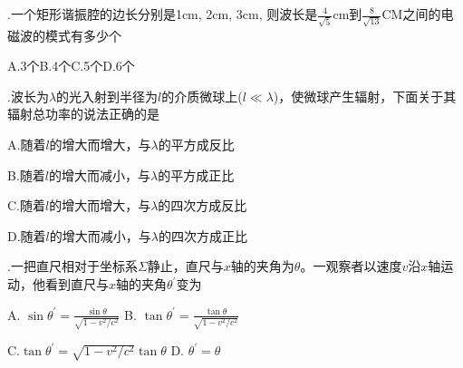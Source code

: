 .\hspace{0.8em}一个矩形谐振腔的边长分别是1cm, 2cm, 3cm, 则波长是$\displaystyle{ \frac{4}{\sqrt{5}} }$cm到$\displaystyle{ \frac{8}{\sqrt{13}} }$CM之间的电磁波的模式有多少个
\vspace{0.2cm}

A.\hspace{0.8em}3个\hspace{5em}B.\hspace{0.8em}4个\hspace{5em}C.\hspace{0.8em}5个\hspace{5em}D.\hspace{0.8em}6个
\vspace{0.3cm}

.\hspace{0.8em}波长为$\lambda$的光入射到半径为$l$的介质微球上($l \ll \lambda $)，使微球产生辐射，下面关于其辐射总功率的说法正确的是
\vspace{0.4cm}

A.\hspace{0.8em}随着$l$的增大而增大，与$\lambda$的平方成反比\vspace{0.2cm}

B.\hspace{0.8em}随着$l$的增大而减小，与$\lambda$的平方成正比\vspace{0.2cm}

C.\hspace{0.8em}随着$l$的增大而增大，与$\lambda$的四次方成反比\vspace{0.2cm}

D.\hspace{0.8em}随着$l$的增大而减小，与$\lambda$的四次方成正比

\newpage

.\hspace{0.8em}一把直尺相对于坐标系$\Sigma$静止，直尺与$x$轴的夹角为$\theta$。一观察者以速度$v$沿$x$轴运动，他看到直尺与$x$轴的夹角$\theta^{'}$变为
\vspace{0.3cm}

A.\hspace{0.8em} $\sin{\theta^{'}} = \displaystyle{ \frac{\sin \theta}{ \sqrt{1 - v^2 / c^2  }}}$\hspace{8em}
B.\hspace{0.8em} $\tan{\theta^{'}} = \displaystyle{ \frac{\tan \theta}{ \sqrt{1 - v^2 / c^2  }}}$\vspace{0.3cm}

C.\hspace{0.8em}$\tan{\theta^{'}} = \displaystyle{  \sqrt{1 - v^2 / c^2  } \tan \theta } $\hspace{6.6em}
D.\hspace{0.8em} $\theta^{'} = \theta $\vspace{0.4cm}

